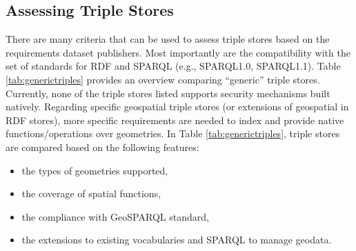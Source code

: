 
\subsection{Assessing Triple Stores }
There are many criteria that can be used to assess triple stores based on the requirements dataset publishers. Most importantly are the compatibility with the set of standards for RDF and SPARQL (e.g., SPARQL1.0, SPARQL1.1). Table \ref{tab:generictriples} provides an overview comparing ``generic'' triple stores. Currently, none of the triple stores listed supports security mechanisms built natively. Regarding specific geospatial triple stores (or extensions of geospatial in RDF stores), more specific requirements are needed to index and provide native functions/operations over geometries. In Table \ref{tab:generictriples}, triple stores are compared based on the following features:

\begin{itemize}
\item the types of geometries supported,
\item the coverage of spatial functions,
\item the compliance with GeoSPARQL standard,
\item the extensions to existing vocabularies and SPARQL to manage geodata.
\end{itemize}

